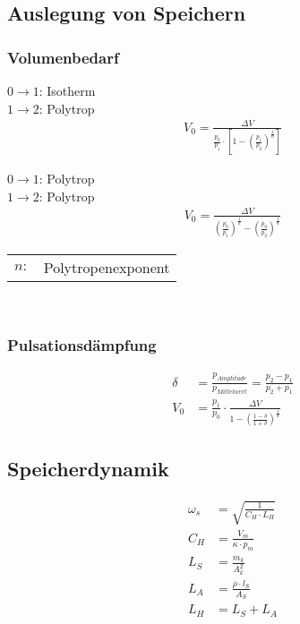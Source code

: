 \documentclass[landscape,a4paper,10pt]{article}
\begin{document}
\begin{multicols*}{3}
\subsection{Auslegung von Speichern}
\subsubsection{Volumenbedarf}
$0 \rightarrow 1$: Isotherm \\
 $1 \rightarrow 2$: Polytrop
\begin{align*}
V_0 = \frac{\Delta V}{\frac{p_0}{p_1} \cdot \left[ 1 - \left( \frac{p_1}{p_2} \right) ^{\frac{1}{n}} \right]}
\end{align*}

$0 \rightarrow 1$: Polytrop \\
 $1 \rightarrow 2$: Polytrop
\begin{align*}
V_0 = \frac{\Delta V}{\left( \frac{p_0}{p_1} \right)^{\frac{1}{n}} - \left( \frac{p_0}{p_2} \right)^{\frac{1}{n}}}
\end{align*}

\begin{tabular}{ll}
$n:$ & Polytropenexponent
\end{tabular} \\



\subsubsection{Pulsationsdämpfung}
\begin{align*}
\delta &= \frac{p_{Amplitude}}{p_{Mittelwert}} = \frac{p_2 - p_1}{p_2 + p_1} \\
V_0 &= \frac{p_1}{p_0} \cdot \frac{\Delta V}{1 - \left( \frac{1-\delta}{1+\delta}\right)^{\frac{1}{n}}}
\end{align*}


\subsection{Speicherdynamik}
\begin{align*}
\omega_s &= \sqrt{\frac{1}{C_H \cdot L_H}} \tag{Eigenfrequenz} \\
C_H &= \frac{V_m}{\kappa \cdot p_m} \tag{Speicherkapazität} \\
L_S &= \frac{m_k}{A_k^2} \tag{Speicherinduktivität} \\
L_A &= \frac{\rho \cdot l_S}{A_S} \tag{Anschlussinduktivität} \\
L_H &= L_S + L_A
\end{align*}


\end{multicols*}
\end{document}
